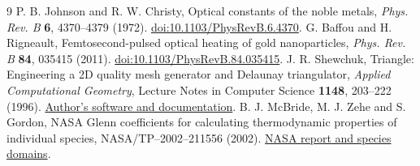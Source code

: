 \documentclass[10pt,a4paper]{article}
\begin{document}
\begin{thebibliography}{9}\small
{} P. B. Johnson and R. W. Christy, Optical constants of the noble metals, \emph{Phys. Rev. B} \textbf{6}, 4370--4379 (1972). \href{https://doi.org/10.1103/PhysRevB.6.4370}{doi:10.1103/PhysRevB.6.4370}.
 G. Baffou and H. Rigneault, Femtosecond-pulsed optical heating of gold nanoparticles, \emph{Phys. Rev. B} \textbf{84}, 035415 (2011). \href{https://doi.org/10.1103/PhysRevB.84.035415}{doi:10.1103/PhysRevB.84.035415}.
 J. R. Shewchuk, Triangle: Engineering a 2D quality mesh generator and Delaunay triangulator, \emph{Applied Computational Geometry}, Lecture Notes in Computer Science \textbf{1148}, 203--222 (1996). \href{https://www.cs.cmu.edu/~quake/triangle.html}{Author's software and documentation}.
 B. J. McBride, M. J. Zehe and S. Gordon, NASA Glenn coefficients for calculating thermodynamic properties of individual species, NASA/TP--2002--211556 (2002). \href{https://ntrs.nasa.gov/citations/20020085330}{NASA report and species domains}.
\end{thebibliography}
\end{document}
